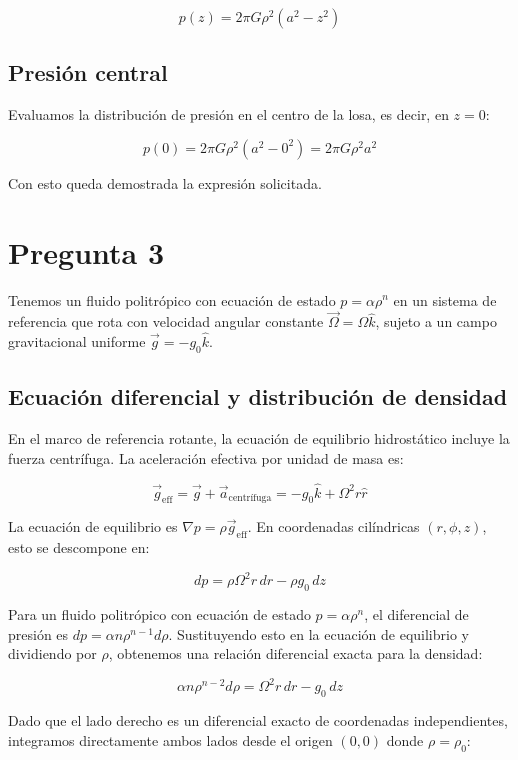 \documentclass{article}
\begin{document}
$$ p(z) = 2\pi G \rho^2 (a^2 - z^2) $$

\subsection{Presión central}

Evaluamos la distribución de presión en el centro de la losa, es decir, en $z=0$:

$$ p(0) = 2\pi G \rho^2 (a^2 - 0^2) = 2\pi G \rho^2 a^2 $$

Con esto queda demostrada la expresión solicitada.

\section{Pregunta 3}

Tenemos un fluido politrópico con ecuación de estado $p = \alpha \rho^n$ en un sistema de referencia que rota con velocidad angular constante $\vec{\Omega} = \Omega \hat{k}$, sujeto a un campo gravitacional uniforme $\vec{g} = -g_0 \hat{k}$.

\subsection{Ecuación diferencial y distribución de densidad}

En el marco de referencia rotante, la ecuación de equilibrio hidrostático incluye la fuerza centrífuga. La aceleración efectiva por unidad de masa es:

$$ \vec{g}_{\text{eff}} = \vec{g} + \vec{a}_{\text{centrífuga}} = -g_0 \hat{k} + \Omega^2 r \hat{r} $$

La ecuación de equilibrio es $\nabla p = \rho \vec{g}_{\text{eff}}$. En coordenadas cilíndricas $(r, \phi, z)$, esto se descompone en:

$$ dp = \rho \Omega^2 r \, dr - \rho g_0 \, dz $$

Para un fluido politrópico con ecuación de estado $p = \alpha \rho^n$, el diferencial de presión es $dp = \alpha n \rho^{n-1} d\rho$. Sustituyendo esto en la ecuación de equilibrio y dividiendo por $\rho$, obtenemos una relación diferencial exacta para la densidad:

$$ \alpha n \rho^{n-2} d\rho = \Omega^2 r \, dr - g_0 \, dz $$

Dado que el lado derecho es un diferencial exacto de coordenadas independientes, integramos directamente ambos lados desde el origen $(0,0)$ donde $\rho=\rho_0$:
\end{document}

